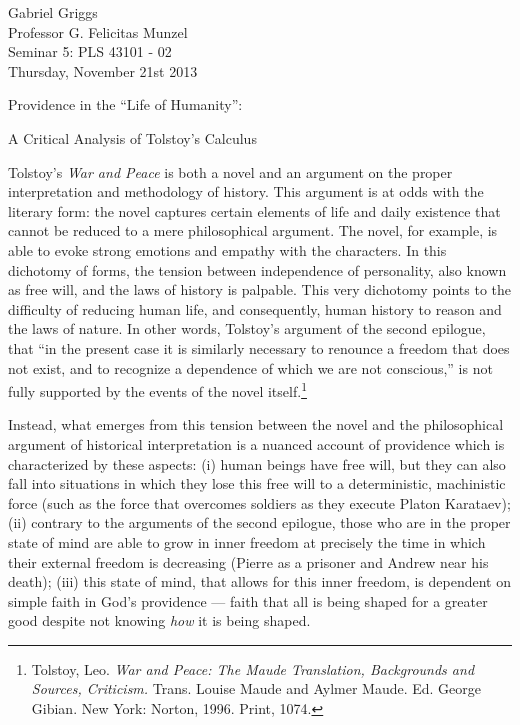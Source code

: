 \documentclass[12pt]{article}
\begin{document}
{\raggedleft{}Gabriel Griggs} \\
Professor G. Felicitas Munzel \\
Seminar 5: PLS 43101 - 02 \\
Thursday, November 21st 2013\\
\centerline{Providence in the ``Life of Humanity'':}
\centerline{A Critical Analysis of Tolstoy's Calculus}
 

Tolstoy's \emph{War and Peace} is both a novel and an argument on the proper interpretation and methodology of history. This argument is at odds with the literary form: the novel captures certain elements of life and daily existence that cannot be reduced to a mere philosophical argument. The novel, for example, is able to evoke strong emotions and empathy with the characters. In this dichotomy of forms, the tension between independence of personality, also known as free will, and the laws of history is palpable. This very dichotomy points to the difficulty of reducing human life, and consequently, human history to reason and the laws of nature. In other words, Tolstoy's argument of the second epilogue, that ``in the present case it is similarly necessary to renounce a freedom that does not exist, and to recognize a dependence of which we are not conscious,'' is not fully supported by the events of the novel itself.\footnote{Tolstoy, Leo. \emph{War and Peace: The Maude Translation, Backgrounds and Sources, Criticism.}
  Trans. Louise Maude and Aylmer Maude. Ed. George Gibian. New York: Norton, 1996. Print, 1074.}

Instead, what emerges from this tension between the novel and the philosophical argument of historical interpretation is a nuanced account of providence which is characterized by these aspects: (i) human beings have free will, but they can also fall into situations in which they lose this free will to a deterministic, machinistic force (such as the force that overcomes soldiers as they execute Platon Karataev); (ii) contrary to the arguments of the second epilogue, those who are in the proper state of mind are able to grow in inner freedom at precisely the time in which their external freedom is decreasing (Pierre as a prisoner and Andrew near his death); (iii) this state of mind, that allows for this inner freedom, is dependent on simple faith in God's providence --- faith that all is being shaped for a greater good despite not knowing \emph{how} it is being shaped.
\end{document}
